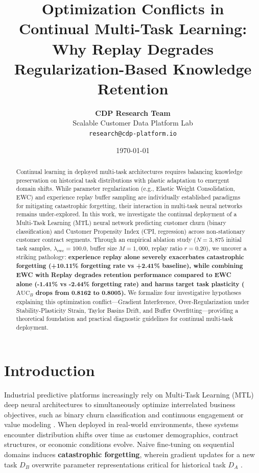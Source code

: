 \documentclass{article}
\title{\textbf{Optimization Conflicts in Continual Multi-Task Learning: \\ Why Replay Degrades Regularization-Based Knowledge Retention}}
\author{
  \textbf{CDP Research Team} \\
  Scalable Customer Data Platform Lab \\
  \texttt{research@cdp-platform.io}
}
\date{\today}
\begin{document}
\maketitle

\begin{abstract}
Continual learning in deployed multi-task architectures requires balancing knowledge preservation on historical task distributions with plastic adaptation to emergent domain shifts. While parameter regularization (e.g., Elastic Weight Consolidation, EWC) and experience replay buffer sampling are individually established paradigms for mitigating catastrophic forgetting, their interaction in multi-task neural networks remains under-explored. In this work, we investigate the continual deployment of a Multi-Task Learning (MTL) neural network predicting customer churn (binary classification) and Customer Propensity Index (CPI, regression) across non-stationary customer contract segments. Through an empirical ablation study ($N=3,875$ initial task samples, $\lambda_{\text{ewc}}=100.0$, buffer size $M=1,000$, replay ratio $r=0.20$), we uncover a striking pathology: \textbf{experience replay alone severely exacerbates catastrophic forgetting (+10.11\% forgetting rate vs +2.41\% baseline), while combining EWC with Replay degrades retention performance compared to EWC alone (-1.41\% vs -2.44\% forgetting rate) and harms target task plasticity ($\text{AUC}_B$ drops from 0.8162 to 0.8005).} We formalize four investigative hypotheses explaining this optimization conflict---Gradient Interference, Over-Regularization under Stability-Plasticity Strain, Taylor Basins Drift, and Buffer Overfitting---providing a theoretical foundation and practical diagnostic guidelines for continual multi-task deployment.
\end{abstract}

\section{Introduction}
Industrial predictive platforms increasingly rely on Multi-Task Learning (MTL) deep neural architectures to simultaneously optimize interrelated business objectives, such as binary churn classification and continuous engagement or value modeling \cite{caruana1997multitask}. When deployed in real-world environments, these systems encounter distribution shifts over time as customer demographics, contract structures, or economic conditions evolve. Naive fine-tuning on sequential domains induces \textbf{catastrophic forgetting}, wherein gradient updates for a new task $D_B$ overwrite parameter representations critical for historical task $D_A$ \cite{french1999catastrophic, mccloskey1989catastrophic}.
\end{document}

